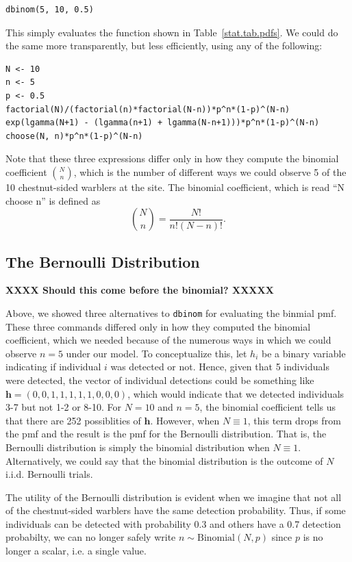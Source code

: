 \begin{verbatim}
dbinom(5, 10, 0.5)
\end{verbatim}
This simply evaluates the function shown in
Table~\ref{stat.tab.pdfs}. We could do the same more transparently, but
less efficiently, using any of the following:
\begin{verbatim}
N <- 10
n <- 5
p <- 0.5
factorial(N)/(factorial(n)*factorial(N-n))*p^n*(1-p)^(N-n)
exp(lgamma(N+1) - (lgamma(n+1) + lgamma(N-n+1)))*p^n*(1-p)^(N-n)
choose(N, n)*p^n*(1-p)^(N-n)
\end{verbatim}

Note that these three expressions differ only in how they compute the
binomial coefficient $\binom{N}{n}$, which is the number of different ways
we could observe 5 of the 10 chestnut-sided warblers at the site. The
binomial coefficient, which is read ``N choose n'' is defined as
\begin{equation}
  \label{eq:1}
  \binom{N}{n} = \frac{N!}{n!(N-n)!}.
\end{equation}





\subsection{The Bernoulli Distribution}

{\bf XXXX Should this come before the binomial? XXXXX}


Above, we showed three alternatives to \verb+dbinom+ for evaluating the
binmial pmf. These three commands differed only in how they computed
the binomial coefficient, which we needed because of the numerous ways
in which we could observe $n=5$ under our model. To conceptualize
this, let $h_i$ be a binary variable indicating if individual $i$
was detected or not. Hence, given that 5 individuals were detected,
the vector of individual detections could be something like
$\mathbf{h}=(0,0,1,1,1,1,1,0,0,0)$, which would indicate
that we detected individuals 3-7 but not 1-2 or 8-10. For $N=10$ and
$n=5$, the binomial coefficient tells us that there
are 252 possiblities of $\mathbf{h}$. However, when $N \equiv 1$, this term
drops from the pmf and the result is the pmf for the Bernoulli
distribution. That is, the Bernoulli distribution is simply the
binomial distribution when $N \equiv 1$. Alternatively, we could say that the binomial
distribution is the outcome of $N$ i.i.d. Bernoulli trials.

The utility of the Bernoulli distribution is evident when we imagine
that not all of the chestnut-sided warblers have the same detection
probability. Thus, if some individuals can be detected with
probability 0.3 and others have a 0.7 detection probabilty, we can no
longer safely write $n \sim \text{Binomial}(N, p)$ since $p$ is no
longer a scalar, i.e. a single value.

